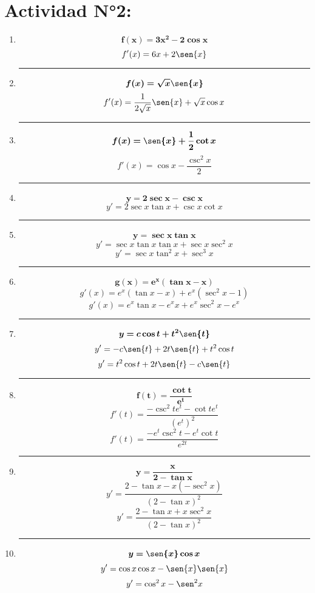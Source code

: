 \documentclass[12pt]{article}
\begin{document}
    \section*{Actividad N°2:}
        \vspace{0.5cm}
        \begin{enumerate}[label=\textbf{\arabic*)}] 
            \hrule\item \[\bm{f(x) = 3x^2 - 2\cos{x}}\]
                \[f'(x) = 6x + 2\sen{x}\] 

            \hrule\item \[\bm{f(x) = \sqrt{x}\sen{x}}\]
                \[f'(x) = \frac{1}{2\sqrt{x}}\sen{x} + \sqrt{x}\cos{x}\] 

            \hrule\item \[\bm{f(x) = \sen{x} + \frac{1}{2}\cot{x}}\]
                \[f'(x) = \cos{x} - \frac{\csc^2{x}}{2}\] 

            \hrule\item \[\bm{y = 2\sec{x} - \csc{x} }\]
                \[y' = 2\sec{x}\tan{x} + \csc{x}\cot{x}\] 

            \hrule\item \[\bm{y = \sec{x}\tan{x}}\]
                \[y' = \sec{x}\tan{x}\tan{x} + \sec{x}\sec^2{x}\] 
                \[y' = \sec{x}\tan^2{x} + \sec^3{x}\] 

            \hrule\item \[\bm{g(x) = e^{x}(\tan{x} - x)}\]
                \[g'(x) = e^x(\tan{x} - x) + e^{x}(\sec^2{x} - 1)\] 
                \[g'(x) = e^x\tan{x} - e^x x + e^{x}\sec^2{x} - e^{x}\] 

            \hrule\item \[\bm{y = c\cos{t} + t^2 \sen{t}}\]
                \[y' = - c\sen{t} + 2t\sen{t} + t^2\cos{t}\] 
                \[y' = t^2\cos{t} + 2t\sen{t} - c\sen{t}\] 

            \hrule\item \[\bm{f(t) = \frac{\cot{t}}{e^t}}\]
                \[f'(t) = \frac{-\csc^2{t}e^t - \cot{t}e^t}{(e^t)^2}\] 
                \[f'(t) = \frac{-e^t\csc^2{t} - e^t\cot{t}}{e^{2t}}\] 

            \newpage
            \hrule\item \[\bm{y = \frac{x}{2 - \tan{x}}}\]
                \[y' = \frac{2 - \tan{x} - x(-\sec^2{x})}{(2 - \tan{x})^2}\] 
                \[y' = \frac{2 - \tan{x} + x\sec^2{x}}{(2 - \tan{x})^2}\] 

            \hrule\item \[\bm{y = \sen{x} \cos{x}}\]
                \[y' = \cos{x}\cos{x} - \sen{x}\sen{x}\] 
                \[y' = \cos^2{x} - \sen^2{x}\] 


\end{enumerate}
\end{document}
